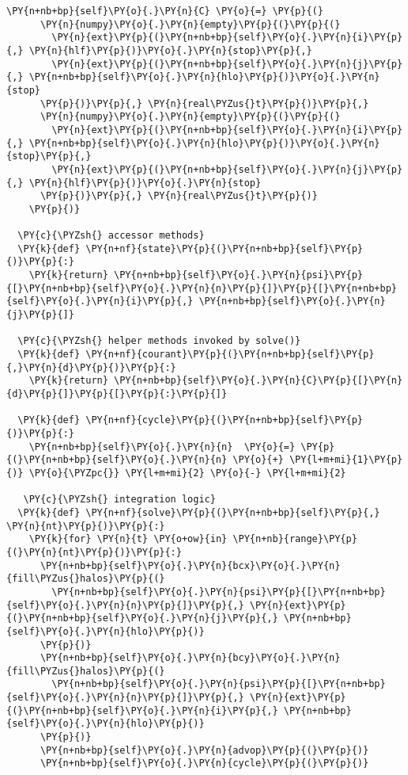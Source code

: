 \begin{Verbatim}[commandchars=\\\{\}]
    \PY{n+nb+bp}{self}\PY{o}{.}\PY{n}{C} \PY{o}{=} \PY{p}{(}
      \PY{n}{numpy}\PY{o}{.}\PY{n}{empty}\PY{p}{(}\PY{p}{(}
        \PY{n}{ext}\PY{p}{(}\PY{n+nb+bp}{self}\PY{o}{.}\PY{n}{i}\PY{p}{,} \PY{n}{hlf}\PY{p}{)}\PY{o}{.}\PY{n}{stop}\PY{p}{,} 
        \PY{n}{ext}\PY{p}{(}\PY{n+nb+bp}{self}\PY{o}{.}\PY{n}{j}\PY{p}{,} \PY{n+nb+bp}{self}\PY{o}{.}\PY{n}{hlo}\PY{p}{)}\PY{o}{.}\PY{n}{stop}
      \PY{p}{)}\PY{p}{,} \PY{n}{real\PYZus{}t}\PY{p}{)}\PY{p}{,}
      \PY{n}{numpy}\PY{o}{.}\PY{n}{empty}\PY{p}{(}\PY{p}{(}
        \PY{n}{ext}\PY{p}{(}\PY{n+nb+bp}{self}\PY{o}{.}\PY{n}{i}\PY{p}{,} \PY{n+nb+bp}{self}\PY{o}{.}\PY{n}{hlo}\PY{p}{)}\PY{o}{.}\PY{n}{stop}\PY{p}{,} 
        \PY{n}{ext}\PY{p}{(}\PY{n+nb+bp}{self}\PY{o}{.}\PY{n}{j}\PY{p}{,} \PY{n}{hlf}\PY{p}{)}\PY{o}{.}\PY{n}{stop}
      \PY{p}{)}\PY{p}{,} \PY{n}{real\PYZus{}t}\PY{p}{)}
    \PY{p}{)}

  \PY{c}{\PYZsh{} accessor methods}
  \PY{k}{def} \PY{n+nf}{state}\PY{p}{(}\PY{n+nb+bp}{self}\PY{p}{)}\PY{p}{:}
    \PY{k}{return} \PY{n+nb+bp}{self}\PY{o}{.}\PY{n}{psi}\PY{p}{[}\PY{n+nb+bp}{self}\PY{o}{.}\PY{n}{n}\PY{p}{]}\PY{p}{[}\PY{n+nb+bp}{self}\PY{o}{.}\PY{n}{i}\PY{p}{,} \PY{n+nb+bp}{self}\PY{o}{.}\PY{n}{j}\PY{p}{]}

  \PY{c}{\PYZsh{} helper methods invoked by solve()}
  \PY{k}{def} \PY{n+nf}{courant}\PY{p}{(}\PY{n+nb+bp}{self}\PY{p}{,}\PY{n}{d}\PY{p}{)}\PY{p}{:}
    \PY{k}{return} \PY{n+nb+bp}{self}\PY{o}{.}\PY{n}{C}\PY{p}{[}\PY{n}{d}\PY{p}{]}\PY{p}{[}\PY{p}{:}\PY{p}{]}

  \PY{k}{def} \PY{n+nf}{cycle}\PY{p}{(}\PY{n+nb+bp}{self}\PY{p}{)}\PY{p}{:}
    \PY{n+nb+bp}{self}\PY{o}{.}\PY{n}{n}  \PY{o}{=} \PY{p}{(}\PY{n+nb+bp}{self}\PY{o}{.}\PY{n}{n} \PY{o}{+} \PY{l+m+mi}{1}\PY{p}{)} \PY{o}{\PYZpc{}} \PY{l+m+mi}{2} \PY{o}{-} \PY{l+m+mi}{2}

   \PY{c}{\PYZsh{} integration logic}
  \PY{k}{def} \PY{n+nf}{solve}\PY{p}{(}\PY{n+nb+bp}{self}\PY{p}{,} \PY{n}{nt}\PY{p}{)}\PY{p}{:}
    \PY{k}{for} \PY{n}{t} \PY{o+ow}{in} \PY{n+nb}{range}\PY{p}{(}\PY{n}{nt}\PY{p}{)}\PY{p}{:}
      \PY{n+nb+bp}{self}\PY{o}{.}\PY{n}{bcx}\PY{o}{.}\PY{n}{fill\PYZus{}halos}\PY{p}{(}
        \PY{n+nb+bp}{self}\PY{o}{.}\PY{n}{psi}\PY{p}{[}\PY{n+nb+bp}{self}\PY{o}{.}\PY{n}{n}\PY{p}{]}\PY{p}{,} \PY{n}{ext}\PY{p}{(}\PY{n+nb+bp}{self}\PY{o}{.}\PY{n}{j}\PY{p}{,} \PY{n+nb+bp}{self}\PY{o}{.}\PY{n}{hlo}\PY{p}{)}
      \PY{p}{)}
      \PY{n+nb+bp}{self}\PY{o}{.}\PY{n}{bcy}\PY{o}{.}\PY{n}{fill\PYZus{}halos}\PY{p}{(}
        \PY{n+nb+bp}{self}\PY{o}{.}\PY{n}{psi}\PY{p}{[}\PY{n+nb+bp}{self}\PY{o}{.}\PY{n}{n}\PY{p}{]}\PY{p}{,} \PY{n}{ext}\PY{p}{(}\PY{n+nb+bp}{self}\PY{o}{.}\PY{n}{i}\PY{p}{,} \PY{n+nb+bp}{self}\PY{o}{.}\PY{n}{hlo}\PY{p}{)}
      \PY{p}{)}
      \PY{n+nb+bp}{self}\PY{o}{.}\PY{n}{advop}\PY{p}{(}\PY{p}{)} 
      \PY{n+nb+bp}{self}\PY{o}{.}\PY{n}{cycle}\PY{p}{(}\PY{p}{)}
  

\end{Verbatim}
